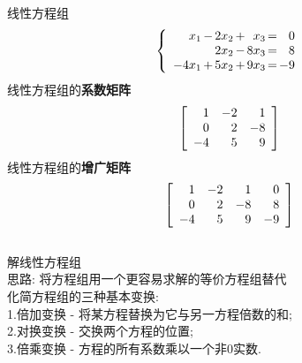 线性方程组
\[\left\{\begin{array}{r@{\hspace{1.5pt}}l@{\hspace{1.5pt}}r@{\hspace{1.5pt}}l@{\hspace{1.5pt}}r@{\hspace{1.5pt}}l@{\hspace{1.5pt}}r}
x_1 & - & 2x_2 & + &  x_3 & = & 0\\
	& 	& 2x_2 & - & 8x_3 & = & 8\\
-4x_1 & + & 5x_2 & + & 9x_3 & = & -9
\end{array}\right.\]
线性方程组的\textbf{系数矩阵}
\[\left[\begin{array}{r r r}
	1 & -2 & 1\\
	0 & 2  & -8\\
	-4 & 5 & 9
\end{array}\right]\]
线性方程组的\textbf{增广矩阵}
\[\left[\begin{array}{r r r r}
	1 & -2 & 1 & 0\\
	0 & 2  & -8 & 8\\
	-4 & 5 & 9 & -9
\end{array}\right]\]\\[2ex]

解线性方程组\\
思路: 将方程组用一个更容易求解的等价方程组替代\\

化简方程组的三种基本变换:\\
1.倍加变换 - 将某方程替换为它与另一方程倍数的和;\\
2.对换变换 - 交换两个方程的位置;\\
3.倍乘变换 - 方程的所有系数乘以一个非0实数.\\

